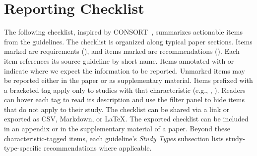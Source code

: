 \section{Reporting Checklist}
\label{sec:checklist}


The following checklist, inspired by CONSORT~\citep{Schulz2010}, summarizes actionable items from the guidelines.
The checklist is organized along typical paper sections.
Items marked \iconM are requirements (\must), and items marked \iconS are recommendations (\should).
Each item references its source guideline by short name.
Items annotated with \paper or \supplementarymaterial indicate where we expect the information to be reported.
Unmarked items may be reported either in the paper or as supplementary material.
Items prefixed with a bracketed tag apply only to studies with that characteristic (e.g., , ).\ifpaper\else{} Readers can hover each tag to read its description and use the filter panel to hide items that do not apply to their study. The checklist can be shared via a link or exported as CSV, Markdown, or LaTeX. The exported checklist can be included in an appendix or in the supplementary material of a paper.\fi
Beyond these characteristic-tagged items, each guideline's \emph{Study Types} subsection lists study-type-specific recommendations where applicable.

